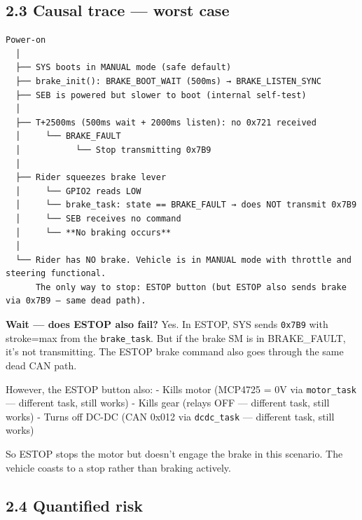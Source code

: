 \documentclass[12pt,a4paper,oneside]{report}
\begin{document}
\subsection{2.3 Causal trace --- worst case}\label{causal-trace-worst-case}

\begin{verbatim}
Power-on
  │
  ├── SYS boots in MANUAL mode (safe default)
  ├── brake_init(): BRAKE_BOOT_WAIT (500ms) → BRAKE_LISTEN_SYNC
  ├── SEB is powered but slower to boot (internal self-test)
  │
  ├── T+2500ms (500ms wait + 2000ms listen): no 0x721 received
  │     └── BRAKE_FAULT
  │           └── Stop transmitting 0x7B9
  │
  ├── Rider squeezes brake lever
  │     └── GPIO2 reads LOW
  │     └── brake_task: state == BRAKE_FAULT → does NOT transmit 0x7B9
  │     └── SEB receives no command
  │     └── **No braking occurs**
  │
  └── Rider has NO brake. Vehicle is in MANUAL mode with throttle and steering functional.
      The only way to stop: ESTOP button (but ESTOP also sends brake via 0x7B9 — same dead path).
\end{verbatim}

\textbf{Wait --- does ESTOP also fail?} Yes. In ESTOP, SYS sends \texttt{0x7B9}
with stroke=max from the \texttt{brake\_task}. But if the brake SM is in
BRAKE\_FAULT, it's not transmitting. The ESTOP brake command also goes through
the same dead CAN path.

However, the ESTOP button also: - Kills motor (MCP4725 = 0V via
\texttt{motor\_task} --- different task, still works) - Kills gear (relays OFF
--- different task, still works) - Turns off DC-DC (CAN 0x012 via
\texttt{dcdc\_task} --- different task, still works)

So ESTOP stops the motor but doesn't engage the brake in this scenario. The
vehicle coasts to a stop rather than braking actively.

\subsection{2.4 Quantified risk}\label{quantified-risk-1}
\end{document}
